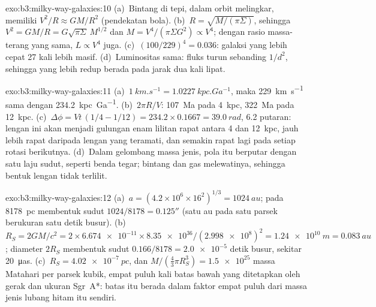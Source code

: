 \begin{solution}{exo:b3:milky-way-galaxies:10}
(a)~Bintang di tepi, dalam orbit melingkar, memiliki $V^2/R \approx GM/R^2$
(pendekatan bola). (b)~$R = \sqrt{M/(\pi\Sigma)}$, sehingga $V^2 =
GM/R = G\sqrt{\pi\Sigma}\,M^{1/2}$ dan $M = V^4/(\pi\Sigma G^2) \propto
V^4$; dengan rasio massa-terang yang sama, $L \propto V^4$ juga.
(c)~$(100/229)^4 = \num{0.036}$: galaksi yang lebih cepat 27 kali lebih
masif. (d)~Luminositas sama: fluks turun sebanding $1/d^2$, sehingga yang lebih redup
berada pada jarak dua kali lipat.
\end{solution}

\begin{solution}{exo:b3:milky-way-galaxies:11}
(a)~$\qty{1}{km.s^{-1}} = \qty{1.0227}{kpc.Ga^{-1}}$, maka
\qty{229}{km.s^{-1}} sama dengan \qty{234.2}{kpc.Ga^{-1}}. (b)~$2\pi R/V$:
\qty{107}{Ma} pada \qty{4}{kpc}, \qty{322}{Ma} pada \qty{12}{kpc}.
(c)~$\Delta\phi = Vt\,(1/4 - 1/12) = 234.2\times0.1667 = \qty{39.0}{rad}$,
6.2 putaran: lengan ini akan menjadi gulungan enam lilitan rapat antara 4 dan
\qty{12}{kpc}, jauh lebih rapat daripada lengan yang teramati, dan semakin rapat lagi
pada setiap rotasi berikutnya. (d)~Dalam gelombang massa jenis, pola itu berputar dengan satu
laju sudut, seperti benda tegar; bintang dan gas melewatinya, sehingga
bentuk lengan tidak terlilit.
\end{solution}

\begin{solution}{exo:b3:milky-way-galaxies:12}
(a)~$a = (4.2\times10^6\times16^2)^{1/3} = \qty{1024}{au}$; pada
\qty{8178}{pc} membentuk sudut $1024/8178 = \ang{;;0.125}$ (satu au pada satu parsek
berukuran satu detik busur). (b)~$R_S = 2GM/c^2 = 2\times\num{6.674e-11}
\times\num{8.35e36}/(\num{2.998e8})^2 = \qty{1.24e10}{m} = \qty{0.083}{au}$;
diameter $2R_S$ membentuk sudut $0.166/8178 = \num{2.0e-5}$ detik busur, sekitar
\qty{20}{\micro as}. (c)~$R_S = \qty{4.02e-7}{pc}$, dan $M/(\tfrac43\pi
R_S^3) = \num{1.5e25}$ massa Matahari per parsek kubik, empat puluh kali
batas bawah yang ditetapkan oleh gerak dan ukuran Sgr~A*: batas itu berada dalam
faktor empat puluh dari massa jenis lubang hitam itu sendiri.
\end{solution}

